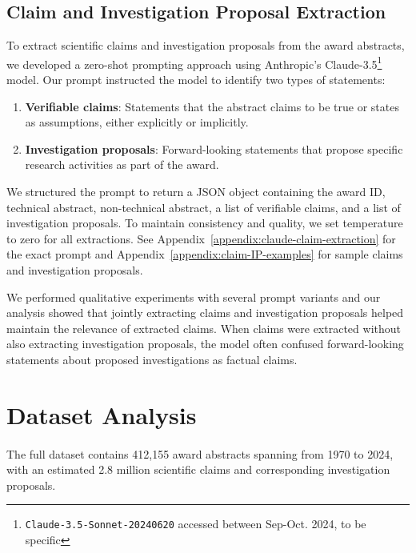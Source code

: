 \documentclass[11pt]{article}
\begin{document}
\subsection{Claim and Investigation Proposal Extraction}
\label{sec:claude-claim-extraction}
To extract scientific claims and investigation proposals from the award abstracts, we developed a zero-shot prompting approach using Anthropic's Claude-3.5\footnote{\texttt{Claude-3.5-Sonnet-20240620} accessed between Sep-Oct. 2024, to be specific} model. Our prompt instructed the model to identify two types of statements:

\begin{enumerate}[noitemsep,topsep=0pt]
\item \textbf{Verifiable claims}: Statements that the abstract claims to be true or states as assumptions, either explicitly or implicitly.
\item \textbf{Investigation proposals}: Forward-looking statements that propose specific research activities as part of the award.
\end{enumerate}

We structured the prompt to return a JSON object containing the award ID, technical abstract, non-technical abstract, a list of verifiable claims, and a list of investigation proposals. To maintain consistency and quality, we set temperature to zero for all extractions. See Appendix~\ref{appendix:claude-claim-extraction} for the exact prompt and Appendix~\ref{appendix:claim-IP-examples} for sample claims and investigation proposals.

We performed qualitative experiments with several prompt variants and our analysis showed that jointly extracting claims and investigation proposals helped maintain the relevance of extracted claims. When claims were extracted without also extracting investigation proposals, the model often confused forward-looking statements about proposed investigations as factual claims.

\section{Dataset Analysis}
\paragraph{\DatasetName} The full dataset contains 412,155 award abstracts spanning from 1970 to 2024, with an estimated 2.8 million scientific claims and corresponding investigation proposals.
\end{document}
